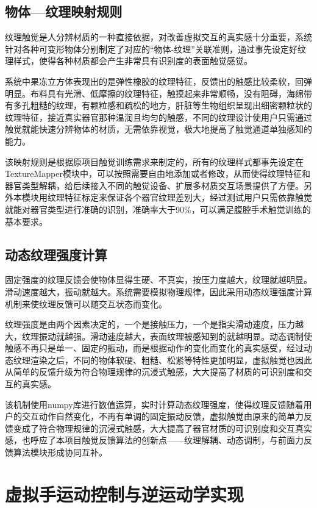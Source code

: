 \subsection{物体---纹理映射规则}

纹理触觉是人分辨材质的一种直接依据，对改善虚拟交互的真实感十分重要，系统针对各种可变形物体分别制定了对应的``物体-纹理''关联准则，通过事先设定好纹理样式，使得各种材质都会产生非常具有识别度的表面触觉感觉。

系统中果冻立方体表现出的是弹性橡胶的纹理特征，反馈出的触感比较柔软，回弹明显。布料具有光滑、低摩擦的纹理特征，触摸起来非常顺畅，没有阻碍，海绵带有多孔粗糙的纹理，有颗粒感和疏松的地方，肝脏等生物组织呈现出细密颗粒状的纹理特征，接近真实器官那种温润且均匀的触感，不同的纹理设计使用户只需通过触觉就能快速分辨物体的材质，无需依靠视觉，极大地提高了触觉通道单独感知的能力。

该映射规则是根据原项目触觉训练需求来制定的，所有的纹理样式都事先设定在TextureMapper模块中，可以按照需要自由地添加或者修改，从而使得纹理特征和器官类型解耦，给后续接入不同的触觉设备、扩展多材质交互场景提供了方便。另外本模块用纹理特征标定来保证各个器官纹理差别大，经过测试用户只需依靠触觉就能对器官类型进行准确的识别，准确率大于90\%，可以满足腹腔手术触觉训练的基本要求。

\subsection{动态纹理强度计算}

固定强度的纹理反馈会使物体显得生硬、不真实，按压力度越大，纹理就越明显。滑动速度越大，振动就越大。系统需要模拟物理规律，因此采用动态纹理强度计算机制来使纹理反馈可以随交互状态而变化。

纹理强度是由两个因素决定的，一个是接触压力，一个是指尖滑动速度，压力越大，纹理振动就越强。滑动速度越大，表面纹理被感知到的就越明显。动态调制使触感不再只是单一、固定的振动，而是根据动作的变化而变化的真实感受，经过动态纹理渲染之后，不同的物体软硬、粗糙、松紧等特性更加明显，虚拟触觉也因此从简单的反馈升级为符合物理规律的沉浸式触感，大大提高了材质的可识别度和交互的真实感。

该机制使用numpy库进行数值运算，实时计算动态纹理强度，使得纹理反馈随着用户的交互动作自然变化，不再有单调的固定振动反馈，虚拟触觉由原来的简单力反馈变成了符合物理规律的沉浸式触感，大大提高了器官材质的可识别度和交互真实感，也呼应了本项目触觉反馈算法的创新点------纹理解耦、动态调制，与前面力反馈算法模块形成协同互补。

\section{虚拟手运动控制与逆运动学实现}

